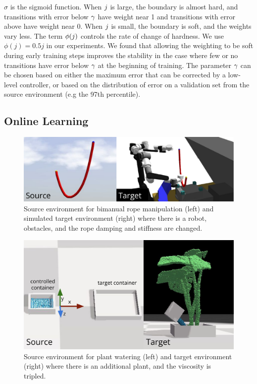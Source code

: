 $\sigma$ is the sigmoid function. When $j$ is large, the boundary is almost hard, and transitions with error below $\gamma$ have weight near 1 and transitions with error above have weight near 0. When $j$ is small, the boundary is soft, and the weights vary less. The term $\phi(j)$ controls the rate of change of hardness. We use $\phi(j)=0.5j$ in our experiments. We found that allowing the weighting to be soft during early training steps improves the stability in the case where few or no transitions have error below $\gamma$ at the beginning of training. The parameter $\gamma$ can be chosen based on either the maximum error that can be corrected by a low-level controller, or based on the distribution of error on a validation set from the source environment (e.g the 97th percentile).

\subsection{Online Learning}

\begin{figure}
    \centering
    \includegraphics[width=\linewidth]{Chap4/images/sim_rope_envs.pdf}
    \caption{Source environment for bimanual rope manipulation (left) and simulated target environment (right) where there is a robot, obstacles, and the rope damping and stiffness are changed.}
    \label{ICRA:fig:sim_rope_envs}
\end{figure}

\begin{figure}
    \centering
    \includegraphics[width=0.7\linewidth]{Chap4/images/sim_water_envs.pdf}
    \caption{Source environment for plant watering (left) and target environment (right) where there is an additional plant, and the viscosity is tripled.}
    \label{ICRA:fig:waterscene}
\end{figure}

